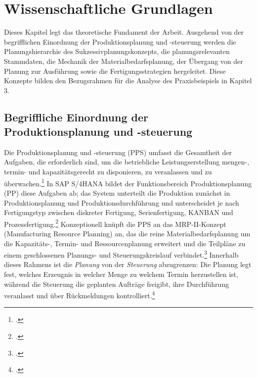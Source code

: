 \newpage
\section{Wissenschaftliche Grundlagen}

Dieses Kapitel legt das theoretische Fundament der Arbeit. Ausgehend von der begrifflichen Einordnung der Produktionsplanung und -steuerung werden die Planungshierarchie des Sukzessivplanungskonzepts, die planungsrelevanten Stammdaten, die Mechanik der Materialbedarfsplanung, der Übergang von der Planung zur Ausführung sowie die Fertigungsstrategien hergeleitet. Diese Konzepte bilden den Bezugsrahmen für die Analyse des Praxisbeispiels in Kapitel 3.

\subsection{Begriffliche Einordnung der Produktionsplanung und -steuerung}
Die Produktionsplanung und -steuerung (PPS) umfasst die Gesamtheit der Aufgaben, die erforderlich sind, um die betriebliche Leistungserstellung mengen-, termin- und kapazitätsgerecht zu disponieren, zu veranlassen und zu überwachen.\footcite[Vgl.][S. 16 ff.]{Kurbel.2021} In SAP S/4HANA bildet der Funktionsbereich Produktionsplanung (PP) diese Aufgaben ab; das System unterteilt die Produktion zunächst in Produktionsplanung und Produktionsdurchführung und unterscheidet je nach Fertigungstyp zwischen diskreter Fertigung, Serienfertigung, KANBAN und Prozessfertigung.\footcite[Vgl.][Folie 5]{SAPUCC.2023} Konzeptionell knüpft die PPS an das MRP-II-Konzept (Manufacturing Resource Planning) an, das die reine Materialbedarfsplanung um die Kapazitäts-, Termin- und Ressourcenplanung erweitert und die Teilpläne zu einem geschlossenen Planungs- und Steuerungskreislauf verbindet.\footcite[Vgl.][S. 101 ff.]{Kurbel.2021} Innerhalb dieses Rahmens ist die \textit{Planung} von der \textit{Steuerung} abzugrenzen: Die Planung legt fest, welches Erzeugnis in welcher Menge zu welchem Termin herzustellen ist, während die Steuerung die geplanten Aufträge freigibt, ihre Durchführung veranlasst und über Rückmeldungen kontrolliert.\footcites[Vgl.][S. 16 ff.]{Kurbel.2021}[ergänzend][Folie 25 f.]{SAPUCC.2023}

